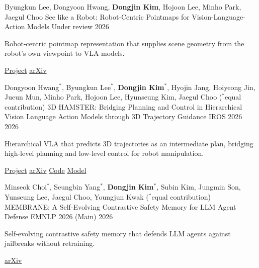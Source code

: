 

\begin{cventries}

  \cventry
    {Byungkun Lee, Dongyoon Hwang, \textbf{Dongjin Kim}, Hojoon Lee, Minho Park, Jaegul Choo}
    {See like a Robot: Robot-Centric Pointmaps for Vision-Language-Action Models}
    {Under review}
    {2026}
    {%
      \begin{cvitems}
        \item Robot-centric pointmap representation that supplies scene geometry from the robot's own viewpoint to VLA models.
        \item \href{https://davian-robotics.github.io/pointmap/}{Project} \quad
              \href{https://arxiv.org/abs/2607.11498}{arXiv}
      \end{cvitems}
    }

  \cventry
    {Dongyoon Hwang$^*$, Byungkun Lee$^*$, \textbf{Dongjin Kim}$^*$, Hyojin Jang, Hoiyeong Jin, Jueun Mun, Minho Park, Hojoon Lee, Hyunseung Kim, Jaegul Choo \quad ($^*$equal contribution)}
    {3D HAMSTER: Bridging Planning and Control in Hierarchical Vision Language Action Models through 3D Trajectory Guidance}
    {IROS 2026}
    {2026}
    {%
      \begin{cvitems}
        \item Hierarchical VLA that predicts 3D trajectories as an intermediate plan, bridging high-level planning and low-level control for robot manipulation.
        \item \href{https://davian-robotics.github.io/3D_HAMSTER/}{Project} \quad
              \href{https://arxiv.org/abs/2606.31329}{arXiv} \quad
              \href{https://github.com/DAVIAN-Robotics/3D_HAMSTER}{Code} \quad
              \href{https://huggingface.co/DAVIAN-Robotics/3D_HAMSTER}{Model}
      \end{cvitems}
    }

  \cventry
    {Minseok Choi$^*$, Seungbin Yang$^*$, \textbf{Dongjin Kim}$^*$, Subin Kim, Jungmin Son, Yunseung Lee, Jaegul Choo, Youngjun Kwak \quad ($^*$equal contribution)}
    {MEMBRANE: A Self-Evolving Contrastive Safety Memory for LLM Agent Defense}
    {EMNLP 2026 (Main)}
    {2026}
    {%
      \begin{cvitems}
        \item Self-evolving contrastive safety memory that defends LLM agents against jailbreaks without retraining.
        \item \href{https://arxiv.org/abs/2606.05743}{arXiv}
      \end{cvitems}
    }


\end{cventries}
